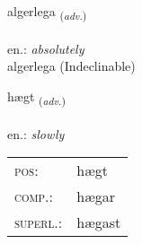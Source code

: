 \documentclass[frontgrid, backgrid]{flacards}\usepackage[]{graphicx}\usepackage[]{xcolor}
\begin{document}

\renewcommand{\flhead}{\vskip5pt \fboxsep=0pt {\small\bfseries\footnotesize Atviksorð | Adverb}}
\renewcommand{\fcfoot}{\vskip5pt \fboxsep=0pt \hspace{2pt}{\small\bfseries\footnotesize 2K}}

\renewcommand{\blhead}{\vskip5pt {\small\bfseries\footnotesize Atviksorð | Adverb }}
\renewcommand{\bcfoot}{\vskip5pt \hspace{2pt}{\small\bfseries\footnotesize 2K}}


{algerlega \small{\textsubscript{(\textit{adv.})}} \\[1ex]
\textphonetic{[alcɛrlɛɣa]} \\
en.: \emph{absolutely} \\  [2ex]
algerlega (Indeclinable)}

\renewcommand{\flhead}{\vskip5pt \fboxsep=0pt {\small\bfseries\footnotesize Atviksorð | Adverb}}
\renewcommand{\fcfoot}{\vskip5pt \fboxsep=0pt \hspace{2pt}{\small\bfseries\footnotesize 2K}}

\renewcommand{\blhead}{\vskip5pt {\small\bfseries\footnotesize Atviksorð | Adverb }}
\renewcommand{\bcfoot}{\vskip5pt \hspace{2pt}{\small\bfseries\footnotesize 2K}}


{hægt \small{\textsubscript{(\textit{adv.})}} \\[1ex] %
\textphonetic{[haixt]} \\
en.: \emph{slowly} \\  [2ex]
\renewcommand*{\arraystretch}{0.8}
\begin{tabular}{ll}
\textsc{pos}: & hægt \\ 
\textsc{comp.}: & hægar \\ 
\textsc{superl.}: & hægast \\
\end{tabular}
}

\renewcommand{\flhead}{\vskip5pt \fboxsep=0pt {\small\bfseries\footnotesize Nafnorð | Noun}}
\renewcommand{\fcfoot}{\vskip5pt \fboxsep=0pt \hspace{2pt}{\small\bfseries\footnotesize 2K}}
\end{document}
